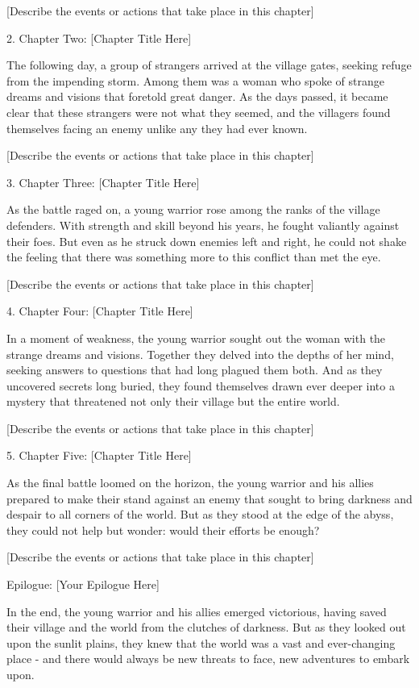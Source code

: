 \documentclass{mytex}
\begin{document}
   [Describe the events or actions that take place in this chapter]

2. Chapter Two: [Chapter Title Here]

   The following day, a group of strangers arrived at the village gates, seeking refuge from the impending storm. Among them was a woman who spoke of strange dreams and visions that foretold great danger. As the days passed, it became clear that these strangers were not what they seemed, and the villagers found themselves facing an enemy unlike any they had ever known.

   [Describe the events or actions that take place in this chapter]

3. Chapter Three: [Chapter Title Here]

   As the battle raged on, a young warrior rose among the ranks of the village defenders. With strength and skill beyond his years, he fought valiantly against their foes. But even as he struck down enemies left and right, he could not shake the feeling that there was something more to this conflict than met the eye.

   [Describe the events or actions that take place in this chapter]

4. Chapter Four: [Chapter Title Here]

   In a moment of weakness, the young warrior sought out the woman with the strange dreams and visions. Together they delved into the depths of her mind, seeking answers to questions that had long plagued them both. And as they uncovered secrets long buried, they found themselves drawn ever deeper into a mystery that threatened not only their village but the entire world.

   [Describe the events or actions that take place in this chapter]

5. Chapter Five: [Chapter Title Here]

   As the final battle loomed on the horizon, the young warrior and his allies prepared to make their stand against an enemy that sought to bring darkness and despair to all corners of the world. But as they stood at the edge of the abyss, they could not help but wonder: would their efforts be enough?

   [Describe the events or actions that take place in this chapter]

Epilogue: [Your Epilogue Here]

In the end, the young warrior and his allies emerged victorious, having saved their village and the world from the clutches of darkness. But as they looked out upon the sunlit plains, they knew that the world was a vast and ever-changing place - and there would always be new threats to face, new adventures to embark upon.
\end{document}
